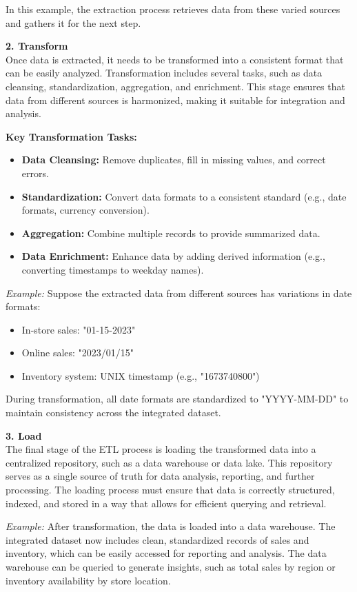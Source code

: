 \documentclass[12pt]{article}
\begin{document}
In this example, the extraction process retrieves data from these varied sources and gathers it for the next step.

\textbf{2. Transform} \\
Once data is extracted, it needs to be transformed into a consistent format that can be easily analyzed. Transformation includes several tasks, such as data cleansing, standardization, aggregation, and enrichment. This stage ensures that data from different sources is harmonized, making it suitable for integration and analysis.

\textbf{Key Transformation Tasks:}
\begin{itemize}
    \item \textbf{Data Cleansing:} Remove duplicates, fill in missing values, and correct errors.
    \item \textbf{Standardization:} Convert data formats to a consistent standard (e.g., date formats, currency conversion).
    \item \textbf{Aggregation:} Combine multiple records to provide summarized data.
    \item \textbf{Data Enrichment:} Enhance data by adding derived information (e.g., converting timestamps to weekday names).
\end{itemize}

\textit{Example:} Suppose the extracted data from different sources has variations in date formats:
\begin{itemize}
    \item In-store sales: "01-15-2023"
    \item Online sales: "2023/01/15"
    \item Inventory system: UNIX timestamp (e.g., "1673740800")
\end{itemize}

During transformation, all date formats are standardized to "YYYY-MM-DD" to maintain consistency across the integrated dataset.

\textbf{3. Load} \\
The final stage of the ETL process is loading the transformed data into a centralized repository, such as a data warehouse or data lake. This repository serves as a single source of truth for data analysis, reporting, and further processing. The loading process must ensure that data is correctly structured, indexed, and stored in a way that allows for efficient querying and retrieval.

\textit{Example:} After transformation, the data is loaded into a data warehouse. The integrated dataset now includes clean, standardized records of sales and inventory, which can be easily accessed for reporting and analysis. The data warehouse can be queried to generate insights, such as total sales by region or inventory availability by store location.
\end{document}
